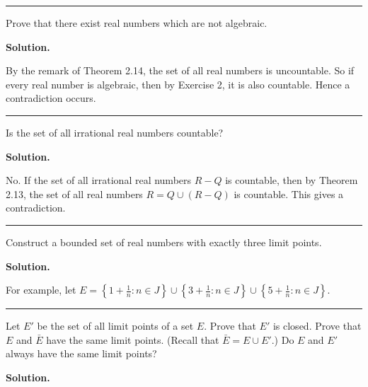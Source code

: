 \documentclass[12pt]{article}
\theoremstyle{definition}
\begin{document}
\bigskip\noindent\hrule\bigskip

Prove that there exist real numbers which are not algebraic.

\smallskip
\noindent\textbf{Solution.}\quad

By the remark of Theorem 2.14, the set of all real numbers is uncountable. So if every real number is algebraic, then by Exercise 2, it is also countable. Hence a contradiction occurs.



\bigskip\noindent\hrule\bigskip

Is the set of all irrational real numbers countable?

\smallskip
\noindent\textbf{Solution.}\quad

No. If the set of all irrational real numbers $R-Q$ is countable, then by Theorem 2.13, the set of all real numbers $R=Q\cup(R-Q)$ is countable. This gives a contradiction.



\bigskip\noindent\hrule\bigskip

Construct a bounded set of real numbers with exactly three limit points.

\smallskip
\noindent\textbf{Solution.}\quad

For example, let $E=\left\{1+\frac{1}{n}:n\in J\right\}\cup\left\{3+\frac{1}{n}:n\in J\right\}\cup\left\{5+\frac{1}{n}:n\in J\right\}$.



\bigskip\noindent\hrule\bigskip

Let $E'$ be the set of all limit points of a set $E$. Prove that $E'$ is closed. Prove that $E$ and $\bar{E}$ have the same limit points. (Recall that $\bar{E}=E\cup E'$.) Do $E$ and $E'$ always have the same limit points?

\smallskip
\noindent\textbf{Solution.}\quad
\end{document}
